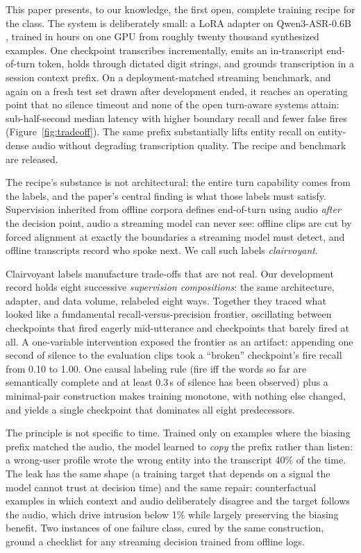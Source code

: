 \documentclass[11pt]{article}
\begin{document}
This paper presents, to our knowledge, the first open, complete training recipe for the class. The system is deliberately small: a LoRA adapter \citep{hu2022lora} on Qwen3-ASR-0.6B \citep{qwen3asr2026}, trained in hours on one GPU from roughly twenty thousand synthesized examples. One checkpoint transcribes incrementally, emits an in-transcript end-of-turn token, holds through dictated digit strings, and grounds transcription in a session context prefix. On a deployment-matched streaming benchmark, and again on a fresh test set drawn after development ended, it reaches an operating point that no silence timeout and none of the open turn-aware systems attain: sub-half-second median latency with higher boundary recall and fewer false fires (Figure~\ref{fig:tradeoff}). The same prefix substantially lifts entity recall on entity-dense audio without degrading transcription quality. The recipe and benchmark are released.

The recipe's substance is not architectural: the entire turn capability comes from the labels, and the paper's central finding is what those labels must satisfy. Supervision inherited from offline corpora defines end-of-turn using audio \emph{after} the decision point, audio a streaming model can never see: offline clips are cut by forced alignment at exactly the boundaries a streaming model must detect, and offline transcripts record who spoke next. We call such labels \emph{clairvoyant}.

Clairvoyant labels manufacture trade-offs that are not real. Our development record holds eight successive \emph{supervision compositions}: the same architecture, adapter, and data volume, relabeled eight ways. Together they traced what looked like a fundamental recall-versus-precision frontier, oscillating between checkpoints that fired eagerly mid-utterance and checkpoints that barely fired at all. A one-variable intervention exposed the frontier as an artifact: appending one second of silence to the evaluation clips took a ``broken'' checkpoint's fire recall from 0.10 to 1.00. One causal labeling rule (fire iff the words so far are semantically complete and at least 0.3\,s of silence has been observed) plus a minimal-pair construction makes training monotone, with nothing else changed, and yields a single checkpoint that dominates all eight predecessors.

The principle is not specific to time. Trained only on examples where the biasing prefix matched the audio, the model learned to \emph{copy} the prefix rather than listen: a wrong-user profile wrote the wrong entity into the transcript 40\% of the time. The leak has the same shape (a training target that depends on a signal the model cannot trust at decision time) and the same repair: counterfactual examples in which context and audio deliberately disagree and the target follows the audio, which drive intrusion below 1\% while largely preserving the biasing benefit. Two instances of one failure class, cured by the same construction, ground a checklist for any streaming decision trained from offline logs.
\end{document}
